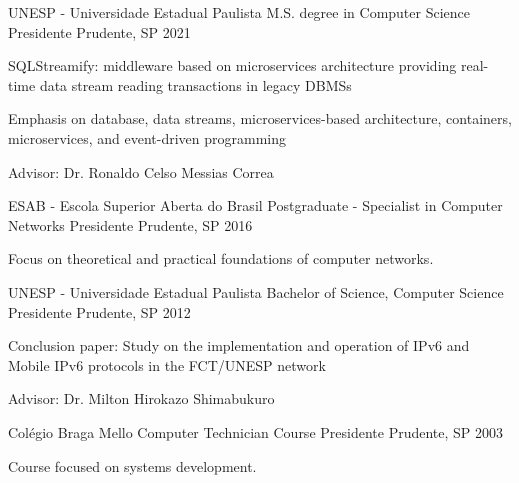 

\begin{cventries}

  \cventry
    {UNESP - Universidade Estadual Paulista} %
    {M.S. degree in Computer Science} %
    {Presidente Prudente, SP} %
    {2021} %
    {
      \begin{cvitems} %
        \item {SQLStreamify: middleware based on microservices
        architecture providing real-time data stream reading
        transactions in legacy DBMSs}
        \item {Emphasis on database, data streams, microservices-based architecture, containers, microservices, and event-driven programming}
        \item {Advisor: Dr. Ronaldo Celso Messias Correa}
      \end{cvitems}
    }

  \cventry
    {ESAB - Escola Superior Aberta do Brasil} %
    {Postgraduate - Specialist in Computer Networks} %
    {Presidente Prudente, SP} %
    {2016} %
    {
      \begin{cvitems} %
        \item {Focus on theoretical and practical foundations of computer networks.}
      \end{cvitems}
    }

  \cventry
    {UNESP - Universidade Estadual Paulista} %
    {Bachelor of Science, Computer Science} %
    {Presidente Prudente, SP} %
    {2012} %
    {
      \begin{cvitems} %
        \item {Conclusion paper: Study on the implementation and operation of IPv6 and Mobile IPv6 protocols in the FCT/UNESP network}
        \item {Advisor: Dr. Milton Hirokazo Shimabukuro}
      \end{cvitems}
    }

  \cventry
  {Colégio Braga Mello} %
  {Computer Technician Course} %
  {Presidente Prudente, SP} %
  {2003} %
  {
    \begin{cvitems} %
      \item {Course focused on systems development.}
    \end{cvitems}
  }

\end{cventries}

